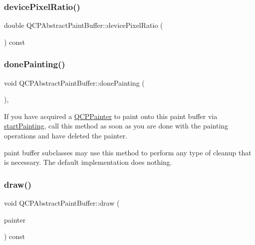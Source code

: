 \subsubsection{\texorpdfstring{devicePixelRatio()}{devicePixelRatio()}}
{\footnotesize\ttfamily double Q\+C\+P\+Abstract\+Paint\+Buffer\+::device\+Pixel\+Ratio (\begin{DoxyParamCaption}{ }\end{DoxyParamCaption}) const\hspace{0.3cm}{\ttfamily [inline]}}

\mbox{\label{class_q_c_p_abstract_paint_buffer_a41b0dc6e7744f19fae09f8532c207dc1}} 
\subsubsection{\texorpdfstring{donePainting()}{donePainting()}}
{\footnotesize\ttfamily void Q\+C\+P\+Abstract\+Paint\+Buffer\+::done\+Painting (\begin{DoxyParamCaption}{ }\end{DoxyParamCaption})\hspace{0.3cm}{\ttfamily [inline]}, {\ttfamily [virtual]}}

If you have acquired a \mbox{\hyperlink{class_q_c_p_painter}{Q\+C\+P\+Painter}} to paint onto this paint buffer via \mbox{\hyperlink{class_q_c_p_abstract_paint_buffer_a9e9f29b19c033cf02fb96f1a148463f3}{start\+Painting}}, call this method as soon as you are done with the painting operations and have deleted the painter.

paint buffer subclasses may use this method to perform any type of cleanup that is necessary. The default implementation does nothing. \mbox{\label{class_q_c_p_abstract_paint_buffer_afb998c7525e3ae37d9d2d46c7aaf461a}} 
\subsubsection{\texorpdfstring{draw()}{draw()}}
{\footnotesize\ttfamily void Q\+C\+P\+Abstract\+Paint\+Buffer\+::draw (\begin{DoxyParamCaption}\item[{\mbox{\hyperlink{class_q_c_p_painter}{Q\+C\+P\+Painter}} $\ast$}]{painter }\end{DoxyParamCaption}) const\hspace{0.3cm}{\ttfamily [pure virtual]}}

